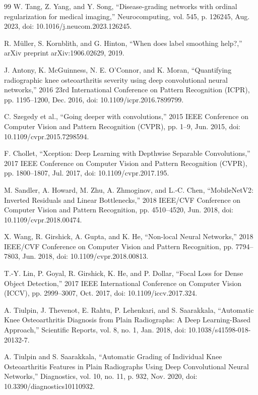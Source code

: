 \documentclass[letterpaper, 10 pt, conference]{ieeeconf}  %
\begin{document}
\begin{thebibliography}{99}
 W. Tang, Z. Yang, and Y. Song, “Disease-grading networks with ordinal regularization for medical imaging,” Neurocomputing, vol. 545, p. 126245, Aug. 2023, doi: 10.1016/j.neucom.2023.126245.

 R. Müller, S. Kornblith, and G. Hinton, “When does label smoothing help?,” arXiv preprint arXiv:1906.02629, 2019.

 J. Antony, K. McGuinness, N. E. O’Connor, and K. Moran, “Quantifying radiographic knee osteoarthritis severity using deep convolutional neural networks,” 2016 23rd International Conference on Pattern Recognition (ICPR), pp. 1195–1200, Dec. 2016, doi: 10.1109/icpr.2016.7899799.

 C. Szegedy et al., “Going deeper with convolutions,” 2015 IEEE Conference on Computer Vision and Pattern Recognition (CVPR), pp. 1–9, Jun. 2015, doi: 10.1109/cvpr.2015.7298594.

 F. Chollet, “Xception: Deep Learning with Depthwise Separable Convolutions,” 2017 IEEE Conference on Computer Vision and Pattern Recognition (CVPR), pp. 1800–1807, Jul. 2017, doi: 10.1109/cvpr.2017.195.

 M. Sandler, A. Howard, M. Zhu, A. Zhmoginov, and L.-C. Chen, “MobileNetV2: Inverted Residuals and Linear Bottlenecks,” 2018 IEEE/CVF Conference on Computer Vision and Pattern Recognition, pp. 4510–4520, Jun. 2018, doi: 10.1109/cvpr.2018.00474.

 X. Wang, R. Girshick, A. Gupta, and K. He, “Non-local Neural Networks,” 2018 IEEE/CVF Conference on Computer Vision and Pattern Recognition, pp. 7794–7803, Jun. 2018, doi: 10.1109/cvpr.2018.00813.

 T.-Y. Lin, P. Goyal, R. Girshick, K. He, and P. Dollar, “Focal Loss for Dense Object Detection,” 2017 IEEE International Conference on Computer Vision (ICCV), pp. 2999–3007, Oct. 2017, doi: 10.1109/iccv.2017.324.

 A. Tiulpin, J. Thevenot, E. Rahtu, P. Lehenkari, and S. Saarakkala, “Automatic Knee Osteoarthritis Diagnosis from Plain Radiographs: A Deep Learning-Based Approach,” Scientific Reports, vol. 8, no. 1, Jan. 2018, doi: 10.1038/s41598-018-20132-7.

 A. Tiulpin and S. Saarakkala, “Automatic Grading of Individual Knee Osteoarthritis Features in Plain Radiographs Using Deep Convolutional Neural Networks,” Diagnostics, vol. 10, no. 11, p. 932, Nov. 2020, doi: 10.3390/diagnostics10110932.


\end{thebibliography}
\end{document}
